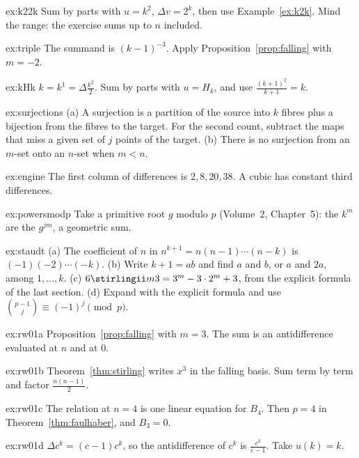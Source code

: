 \begin{hint}{ex:k22k}
Sum by parts with $u=k^2$, $\Delta v=2^k$, then use Example~\ref{ex:k2k}. Mind the range: the exercise sums up to $n$
included.
\end{hint}
\begin{hint}{ex:triple}
The summand is $(k-1)^{\underline{-3}}$. Apply Proposition~\ref{prop:falling} with $m=-2$.
\end{hint}
\begin{hint}{ex:kHk}
$k=k^{\underline1}=\Delta\frac{k^{\underline2}}2$. Sum by parts with $u=H_k$, and use $\frac{(k+1)^{\underline2}}{k+1}=k$.
\end{hint}
\begin{hint}{ex:surjections}
(a) A surjection is a partition of the source into $k$ fibres plus a bijection from the fibres to the target. For the
second count, subtract the maps that miss a given set of $j$ points of the target.
(b) There is no surjection from an $m$-set onto an $n$-set when $m<n$.
\end{hint}
\begin{hint}{ex:engine}
The first column of differences is $2,8,20,38$. A cubic has constant third differences.
\end{hint}
\begin{hint}{ex:powersmodp}
Take a primitive root $g$ modulo $p$ (Volume~2, Chapter~5): the $k^m$ are the $g^{jm}$, a geometric sum.
\end{hint}
\begin{hint}{ex:staudt}
(a) The coefficient of $n$ in $n^{\underline{k+1}}=n(n-1)\cdots(n-k)$ is $(-1)(-2)\cdots(-k)$. (b) Write $k+1=ab$ and find $a$ and $b$, or $a$ and $2a$,
among $1,\dots,k$. (c) $6\stirlingii m3=3^m-3\cdot2^m+3$, from the explicit formula of the last section. (d) Expand with the
explicit formula and use $\binom{p-1}j\equiv(-1)^j\pmod p$.
\end{hint}
\begin{hint}{ex:rw01a}
Proposition~\ref{prop:falling} with $m=3$. The sum is an antidifference evaluated at $n$ and at $0$.
\end{hint}
\begin{hint}{ex:rw01b}
Theorem~\ref{thm:stirling} writes $x^3$ in the falling basis. Sum term by term and factor $\frac{n(n-1)}2$.
\end{hint}
\begin{hint}{ex:rw01c}
The relation at $n=4$ is one linear equation for $B_4$. Then $p=4$ in Theorem~\ref{thm:faulhaber}, and $B_3=0$.
\end{hint}
\begin{hint}{ex:rw01d}
$\Delta c^k=(c-1)c^k$, so the antidifference of $c^k$ is $\frac{c^k}{c-1}$. Take $u(k)=k$.
\end{hint}

